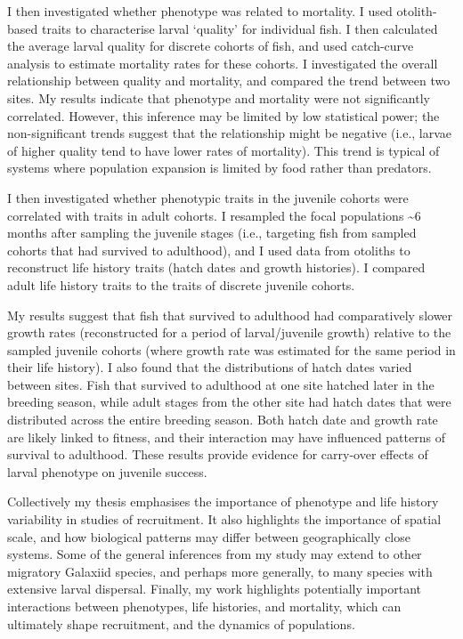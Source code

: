 \documentclass[]{book}
\begin{document}
I then investigated whether phenotype was related to mortality. I used
otolith-based traits to characterise larval `quality' for individual
fish. I then calculated the average larval quality for discrete cohorts
of fish, and used catch-curve analysis to estimate mortality rates for
these cohorts. I investigated the overall relationship between quality
and mortality, and compared the trend between two sites. My results
indicate that phenotype and mortality were not significantly correlated.
However, this inference may be limited by low statistical power; the
non-significant trends suggest that the relationship might be negative
(i.e., larvae of higher quality tend to have lower rates of mortality).
This trend is typical of systems where population expansion is limited
by food rather than predators.

I then investigated whether phenotypic traits in the juvenile cohorts
were correlated with traits in adult cohorts. I resampled the focal
populations \textasciitilde{}6 months after sampling the juvenile stages
(i.e., targeting fish from sampled cohorts that had survived to
adulthood), and I used data from otoliths to reconstruct life history
traits (hatch dates and growth histories). I compared adult life history
traits to the traits of discrete juvenile cohorts.

My results suggest that fish that survived to adulthood had
comparatively slower growth rates (reconstructed for a period of
larval/juvenile growth) relative to the sampled juvenile cohorts (where
growth rate was estimated for the same period in their life history). I
also found that the distributions of hatch dates varied between sites.
Fish that survived to adulthood at one site hatched later in the
breeding season, while adult stages from the other site had hatch dates
that were distributed across the entire breeding season. Both hatch date
and growth rate are likely linked to fitness, and their interaction may
have influenced patterns of survival to adulthood. These results provide
evidence for carry-over effects of larval phenotype on juvenile success.

Collectively my thesis emphasises the importance of phenotype and life
history variability in studies of recruitment. It also highlights the
importance of spatial scale, and how biological patterns may differ
between geographically close systems. Some of the general inferences
from my study may extend to other migratory Galaxiid species, and
perhaps more generally, to many species with extensive larval dispersal.
Finally, my work highlights potentially important interactions between
phenotypes, life histories, and mortality, which can ultimately shape
recruitment, and the dynamics of populations.
\end{document}
